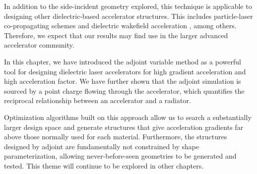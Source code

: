 In addition to the side-incident geometry explored, this technique is applicable to designing other dielectric-based accelerator structures.
This includes particle-laser co-propagating schemes \cite{cowan2008three} and dielectric wakefield acceleration
\cite{zhang1997stimulated}, among others.
Therefore, we expect that our results may find use in the larger advanced accelerator community.

In this chapter, we have introduced the adjoint variable method as a powerful tool for designing dielectric laser accelerators for high gradient acceleration and high acceleration factor.
We have further shown that the adjoint simulation is sourced by a point charge flowing through the accelerator, which quantifies the reciprocal relationship between an accelerator and a radiator.

Optimization algorithms built on this approach allow us to search a substantially larger design space and generate structures that give acceleration gradients far above those normally used for each material.
Furthermore, the structures designed by adjoint are fundamentally not constrained by shape parameterization, allowing never-before-seen geometries to be generated and tested.
This theme will continue to be explored in other chapters.
